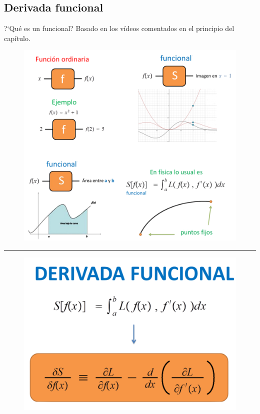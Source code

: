 \subsection{Derivada funcional}
\label{T8Funcional}
\vspace{-5mm}
\vspace{1cm}

\begin{myexampleblock}{ ?`Qué es un funcional?}
Basado en los vídeos comentados en el principio del capítulo.	

	
	
\begin{figure}[H]
		\centering
		\includegraphics[width=1\textwidth]{imagenes/img08-01.png}
	\end{figure}
	
\begin{center} \rule{200pt}{0.1pt} \end{center}

\begin{figure}[H]
		\centering
		\includegraphics[width=.5\textwidth]{imagenes/img08-02a.png}
	\end{figure}
	

\end{myexampleblock}
